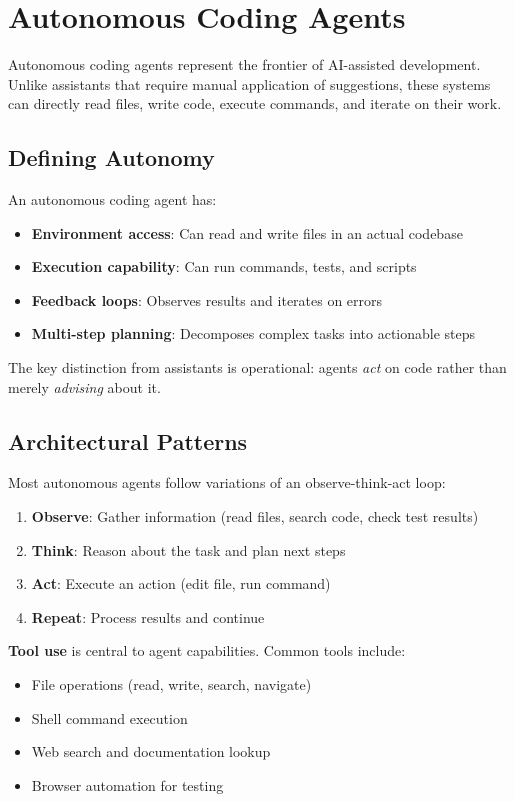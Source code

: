 \section{Autonomous Coding Agents}
\label{sec:agents}

Autonomous coding agents represent the frontier of AI-assisted development. Unlike assistants that require manual application of suggestions, these systems can directly read files, write code, execute commands, and iterate on their work.

\subsection{Defining Autonomy}

An autonomous coding agent has:
\begin{itemize}
    \item \textbf{Environment access}: Can read and write files in an actual codebase
    \item \textbf{Execution capability}: Can run commands, tests, and scripts
    \item \textbf{Feedback loops}: Observes results and iterates on errors
    \item \textbf{Multi-step planning}: Decomposes complex tasks into actionable steps
\end{itemize}

The key distinction from assistants is operational: agents \emph{act} on code rather than merely \emph{advising} about it.

\subsection{Architectural Patterns}

Most autonomous agents follow variations of an observe-think-act loop:

\begin{enumerate}
    \item \textbf{Observe}: Gather information (read files, search code, check test results)
    \item \textbf{Think}: Reason about the task and plan next steps
    \item \textbf{Act}: Execute an action (edit file, run command)
    \item \textbf{Repeat}: Process results and continue
\end{enumerate}

\textbf{Tool use} is central to agent capabilities. Common tools include:
\begin{itemize}
    \item File operations (read, write, search, navigate)
    \item Shell command execution
    \item Web search and documentation lookup
    \item Browser automation for testing
\end{itemize}

